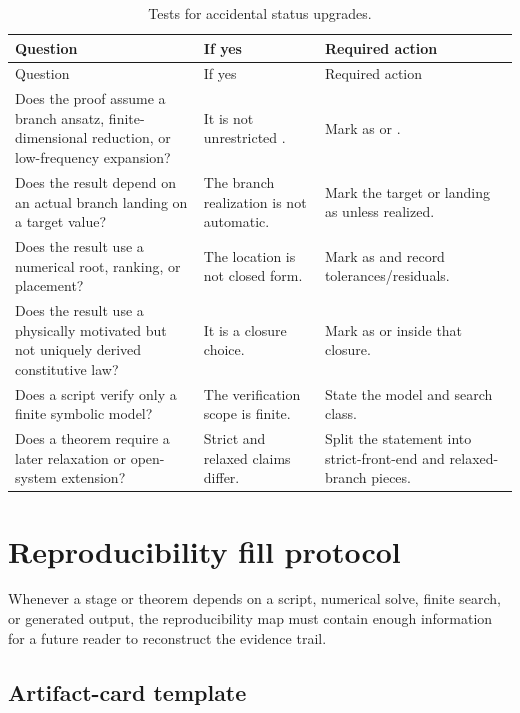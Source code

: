 \begin{longtable}{@{}L{0.26\textwidth}L{0.38\textwidth}L{0.26\textwidth}@{}}
\caption{Tests for accidental status upgrades.}\label{tab:status-upgrade-tests}\\
\toprule
Question & If yes & Required action \\
\midrule
\endfirsthead
\toprule
Question & If yes & Required action \\
\midrule
\endhead
Does the proof assume a branch ansatz, finite-dimensional reduction, or low-frequency expansion? & It is not unrestricted \StatusExact{}. & Mark as \StatusExactClosure{} or \StatusReduced{}. \\
\addlinespace
Does the result depend on an actual branch landing on a target value? & The branch realization is not automatic. & Mark the target or landing as \StatusOpen{} unless realized. \\
\addlinespace
Does the result use a numerical root, ranking, or placement? & The location is not closed form. & Mark as \StatusNumerical{} and record tolerances/residuals. \\
\addlinespace
Does the result use a physically motivated but not uniquely derived constitutive law? & It is a closure choice. & Mark as \StatusEffective{} or \StatusExactClosure{} inside that closure. \\
\addlinespace
Does a script verify only a finite symbolic model? & The verification scope is finite. & State the model and search class. \\
\addlinespace
Does a theorem require a later relaxation or open-system extension? & Strict and relaxed claims differ. & Split the statement into strict-front-end and relaxed-branch pieces. \\
\bottomrule
\end{longtable}

\section{Reproducibility fill protocol}
\label{sec:reproducibility-fill-protocol}

Whenever a stage or theorem depends on a script, numerical solve, finite search, or generated output, the reproducibility map must contain enough information for a future reader to reconstruct the evidence trail.

\subsection{Artifact-card template}
\label{subsec:artifact-card-template-fill}

